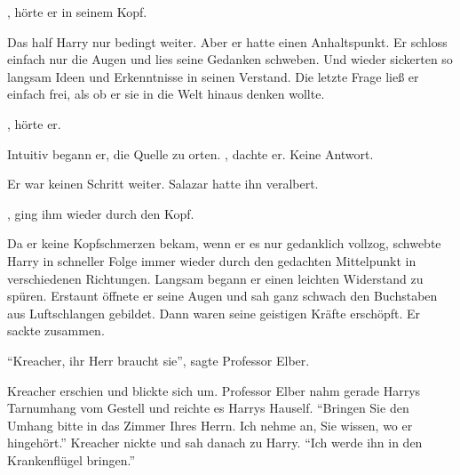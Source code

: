 
, hörte er in seinem Kopf.





Das half Harry nur bedingt weiter. Aber er hatte einen Anhaltspunkt. Er schloss einfach nur die Augen und lies seine Gedanken schweben. Und wieder sickerten so langsam Ideen und Erkenntnisse in seinen Verstand.  Die letzte Frage ließ er einfach frei, als ob er sie in die Welt hinaus denken wollte.

, hörte er.

Intuitiv begann er, die Quelle zu orten. , dachte er.  Keine Antwort. 



Er war keinen Schritt weiter. Salazar hatte ihn veralbert.

, ging ihm wieder durch den Kopf.

Da er keine Kopfschmerzen bekam, wenn er es nur gedanklich vollzog, schwebte Harry in schneller Folge immer wieder durch den gedachten Mittelpunkt in verschiedenen Richtungen. Langsam begann er einen leichten Widerstand zu spüren. Erstaunt öffnete er seine Augen und sah ganz schwach den Buchstaben  aus Luftschlangen gebildet. Dann waren seine geistigen Kräfte erschöpft. Er sackte zusammen.

\enquote{Kreacher, ihr Herr braucht sie}, sagte Professor Elber.

Kreacher erschien und blickte sich um. Professor Elber nahm gerade Harrys Tarnumhang vom Gestell und reichte es Harrys Hauself. \enquote{Bringen Sie den Umhang bitte in das Zimmer Ihres Herrn. Ich nehme an, Sie wissen, wo er hingehört.} Kreacher nickte und sah danach zu Harry. \enquote{Ich werde ihn in den Krankenflügel bringen.}

